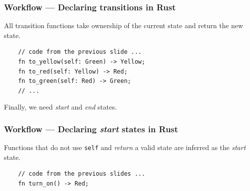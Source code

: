 \documentclass[bigger,notes,aspectratio=169]{beamer}
\begin{document}
\begin{frame}[fragile]
    \frametitle{Workflow --- Declaring transitions in Rust}
    All transition functions take ownership of the current state and return the new state.
    \begin{listing}
        \centering
        \begin{verbatim}
    // code from the previous slide ...
    fn to_yellow(self: Green) -> Yellow;
    fn to_red(self: Yellow) -> Red;
    fn to_green(self: Red) -> Green;
    // ...
        \end{verbatim}
    \end{listing}
    Finally, we need \emph{start} and \emph{end} states.

\end{frame}

\begin{frame}[fragile]
    \frametitle{Workflow --- Declaring \emph{start} states in Rust}
    Functions that do not use \texttt{self} and \emph{return} a valid state are inferred as the \emph{start} state.

    \begin{listing}
        \centering
        \begin{verbatim}
    // code from the previous slides ...
    fn turn_on() -> Red;
        \end{verbatim}
    \end{listing}

\end{frame}
\end{document}

